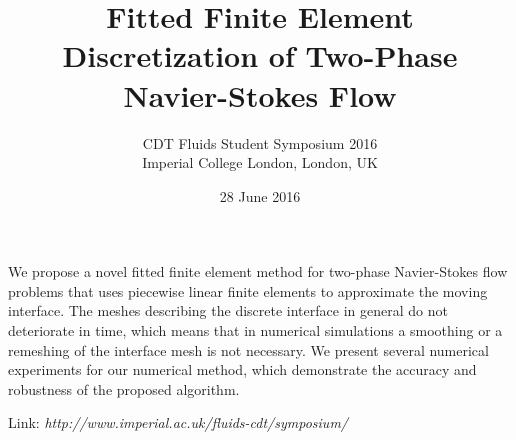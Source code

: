\documentclass{article}
\begin{document}
\title{Fitted Finite Element Discretization of Two-Phase Navier-Stokes Flow}
\date{28 June 2016}
\author{CDT Fluids Student Symposium 2016\\
Imperial College London, London, UK}

\maketitle
We propose a novel fitted finite element method for two-phase Navier-Stokes flow
problems that uses piecewise linear finite elements to approximate the moving
interface. The meshes describing the discrete interface in general do not
deteriorate in time, which means that in numerical simulations a smoothing or a
remeshing of the interface mesh is not necessary. We present several numerical
experiments for our numerical method, which demonstrate the accuracy and
robustness of the proposed algorithm.

Link: \emph{http://www.imperial.ac.uk/fluids-cdt/symposium/}
\end{document}
